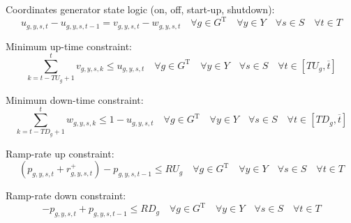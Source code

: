 \documentclass{article}
\newcommand{\sGeneratorsThermal}{G^{\mathrm{T}}}
\newcommand{\sYears}{Y}
\newcommand{\sScenarios}{S}
\newcommand{\sIntervals}{T}
\newcommand{\iGenerator}{g}
\newcommand{\iYear}{y}
\newcommand{\iScenario}{s}
\newcommand{\iInterval}{t}
\newcommand{\iIntervalAlias}{k}
\newcommand{\iIntervalTerminal}{\overline{\iInterval}}
\newcommand{\cUpTimeMin}[1][\iGenerator]{TU_{#1}}
\newcommand{\cDownTimeMin}[1][\iGenerator]{TD_{#1}}
\newcommand{\cRampRateUp}[1][\iGenerator]{RU_{#1}}
\newcommand{\cRampRateDown}[1][\iGenerator]{RD_{#1}}
\newcommand{\vStartupIndicator}[1][\iGenerator,\iYear,\iScenario,\iInterval]{v_{#1}}
\newcommand{\vShutdownIndicator}[1][\iGenerator,\iYear,\iScenario,\iInterval]{w_{#1}}
\newcommand{\vReserveUp}[1][\iGenerator,\iYear,\iScenario,\iInterval]{r^{+}_{#1}}
\newcommand{\vOnIndicator}[1][\iGenerator,\iYear,\iScenario,\iInterval]{u_{#1}}
\newcommand{\vPower}[1][\iGenerator,\iYear,\iScenario,\iInterval]{p_{#1}}
\begin{document}
Coordinates generator state logic (on, off, start-up, shutdown):
\begin{equation}
\vOnIndicator - \vOnIndicator[\iGenerator,\iYear,\iScenario,\iInterval-1] = \vStartupIndicator - \vShutdownIndicator \quad \forall \iGenerator \in \sGeneratorsThermal \quad \forall \iYear \in \sYears \quad \forall \iScenario \in \sScenarios \quad \forall \iInterval \in \sIntervals
\end{equation}

Minimum up-time constraint:
\begin{equation}
\sum\limits_{\iIntervalAlias=\iInterval-\cUpTimeMin + 1}^{\iInterval} \vStartupIndicator[\iGenerator,\iYear,\iScenario,\iIntervalAlias] \leq \vOnIndicator \quad \forall \iGenerator \in \sGeneratorsThermal \quad \forall \iYear \in \sYears \quad \forall \iScenario \in \sScenarios \quad \forall \iInterval \in \left[\cUpTimeMin, \iIntervalTerminal \right]
\end{equation}

Minimum down-time constraint:
\begin{equation}
\sum\limits_{\iIntervalAlias=\iInterval-\cDownTimeMin[\iGenerator]+1}^{\iInterval}\vShutdownIndicator[\iGenerator,\iYear,\iScenario,\iIntervalAlias] \leq 1 - \vOnIndicator \quad \forall \iGenerator \in \sGeneratorsThermal \quad \forall \iYear \in \sYears \quad \forall \iScenario \in \sScenarios \quad \forall \iInterval \in \left[\cDownTimeMin, \iIntervalTerminal \right]
\end{equation}

Ramp-rate up constraint:
\begin{equation}
\left(\vPower + \vReserveUp\right) - \vPower[\iGenerator,\iYear,\iScenario,\iInterval-1] \leq \cRampRateUp \quad \forall \iGenerator \in \sGeneratorsThermal \quad \forall \iYear \in \sYears \quad \forall \iScenario \in \sScenarios \quad \forall \iInterval \in \sIntervals
\end{equation}

Ramp-rate down constraint:
\begin{equation}
- \vPower + \vPower[\iGenerator,\iYear,\iScenario,\iInterval-1] \leq \cRampRateDown \quad \forall \iGenerator \in \sGeneratorsThermal \quad \forall \iYear \in \sYears \quad \forall \iScenario \in \sScenarios \quad \forall \iInterval \in \sIntervals
\end{equation}
\end{document}
